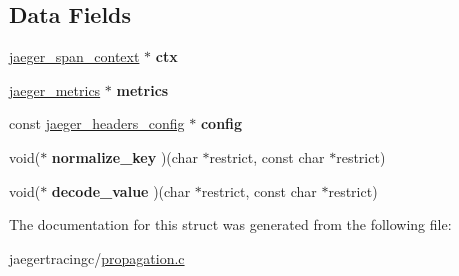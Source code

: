 \subsection*{Data Fields}
\begin{DoxyCompactItemize}
\item 
\mbox{\label{structextract__text__map__arg_ab33860ffded14af993fee96f5d61cd6f}} 
\mbox{\hyperlink{structjaeger__span__context}{jaeger\+\_\+span\+\_\+context}} $\ast$ {\bfseries ctx}
\item 
\mbox{\label{structextract__text__map__arg_a8d7e24ae1b3ae598b01d9e38e78fd002}} 
\mbox{\hyperlink{structjaeger__metrics}{jaeger\+\_\+metrics}} $\ast$ {\bfseries metrics}
\item 
\mbox{\label{structextract__text__map__arg_aa06ff45434635affaff6e18a9d016e1e}} 
const \mbox{\hyperlink{structjaeger__headers__config}{jaeger\+\_\+headers\+\_\+config}} $\ast$ {\bfseries config}
\item 
\mbox{\label{structextract__text__map__arg_ad66d013a675a98ad4744a26c84971355}} 
void($\ast$ {\bfseries normalize\+\_\+key} )(char $\ast$restrict, const char $\ast$restrict)
\item 
\mbox{\label{structextract__text__map__arg_ac93640eecdaf124320f4e9fc975970f6}} 
void($\ast$ {\bfseries decode\+\_\+value} )(char $\ast$restrict, const char $\ast$restrict)
\end{DoxyCompactItemize}


The documentation for this struct was generated from the following file\+:\begin{DoxyCompactItemize}
\item 
jaegertracingc/\mbox{\hyperlink{propagation_8c}{propagation.\+c}}\end{DoxyCompactItemize}
